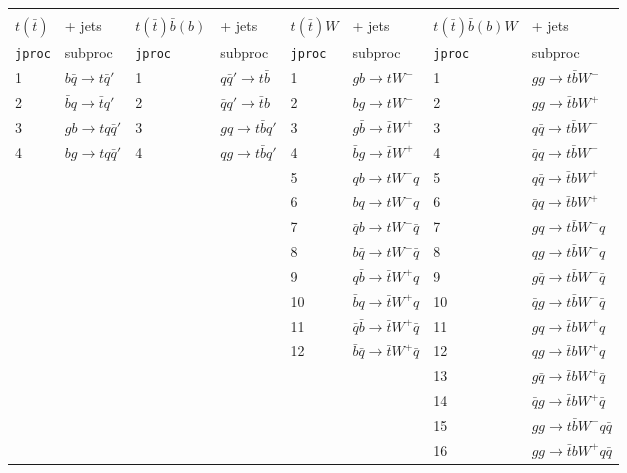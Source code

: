 \documentclass[paper]{JHEP3}
\def    \qbar   {\bar{q}}
\def    \bbar   {\bar{b}}
\def    \tbar   {\bar{t}}
\begin{document}
\begin{table}
\begin{center}
\begin{tabular}{ll|ll|ll|ll}

 &      &         &           &             & \\

$t(\bar t)$ &+ jets   & $t(\bar t) \bbar(b)$ &+ jets        &    $t(\bar t) W $ &+ jets          &  $t(\bar t) \bbar(b) W$ &+ jets         \\
{\tt jproc} & subproc & {\tt jproc} & subproc & {\tt jproc} &
subproc &{\tt jproc} & subproc \\ 
1 & $b \qbar \to  t \qbar'$ & 1 & $q \qbar' \to  t \bbar$  & 1 & $g b \to t W^-$ & 1 & $g g \to t \bbar W^-$ \\ 
2 & $\bbar q \to \tbar q'$ & 2 & $\qbar q' \to \tbar b$  & 2 & $b g \to t W^-$ & 2 & $g g \to \tbar b W^+$\\ 
3 & $g b \to  t q \qbar'$ & 3 & $g q \to  t \bbar q'$ & 3 & $g \bbar \to \tbar W^+$ & 3 & $q \qbar \to t \bbar W^-$ \\
4 & $b g \to  t q \qbar'$ & 4 & $q g \to  t \bbar q'$ & 4 & $\bbar g \to \tbar W^+$ & 4 & $\qbar q \to t \bbar W^-$ \\
  &                     &   &                       & 5 & $q b \to t W^- q $ & 5 & $q \qbar \to \tbar b W^+$\\
  &                     &   &                       & 6 & $b q \to t W^- q $ & 6 & $\qbar q \to \tbar b W^+$ \\
  &                     &   &                       & 7 & $\qbar b \to t W^- \qbar $ &  7 & $g q \to t \bbar W^- q$ \\
  &                     &   &                       & 8 & $b \qbar \to t W^- \qbar $ &  8 & $q g \to t \bbar W^- q $ \\
  &                     &   &                       & 9 & $q \bbar \to \tbar W^+ q $ &  9 & $g \qbar \to t \bbar W^- \qbar $\\
  &                     &   &                       & 10 & $\bbar q \to \tbar W^+ q $ & 10 & $\qbar g \to t \bbar W^- \qbar $\\
  &                     &   &                       & 11 & $\qbar \bbar \to \tbar W^+ \qbar $ &  11 & $g q \to \tbar b W^+ q $\\
  &                     &   &                       & 12 & $\bbar \qbar \to \tbar W^+ \qbar $ &  12 & $q g \to \tbar b W^+ q $\\
  &                     &   &                       &    &                             
  &   13 & $g \qbar \to \tbar b W^+ \qbar $\\
  &                     &   &                       &    &                             
  &   14 & $\qbar g \to \tbar b W^+ \qbar $\\
  &                     &   &                       &    &                             
  &   15 & $g g \to t \bbar W^- q \qbar $\\
  &                     &   &                       &    &                             
  &   16 & $g g \to \tbar b W^+ q \qbar $\\


\end{tabular}
\end{center}
\end{table}
\end{document}
